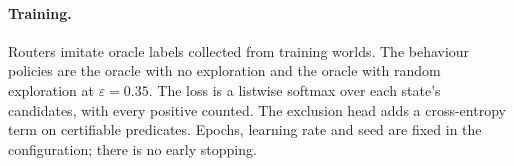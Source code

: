 \paragraph{Training.} Routers imitate oracle labels collected from training worlds. The behaviour policies are the
oracle with no exploration and the oracle with random exploration at $\varepsilon=0.35$. The loss is a listwise softmax
over each state's candidates, with every positive counted. The exclusion head adds a cross-entropy term on certifiable
predicates. Epochs, learning rate and seed are fixed in the configuration; there is no early stopping.
